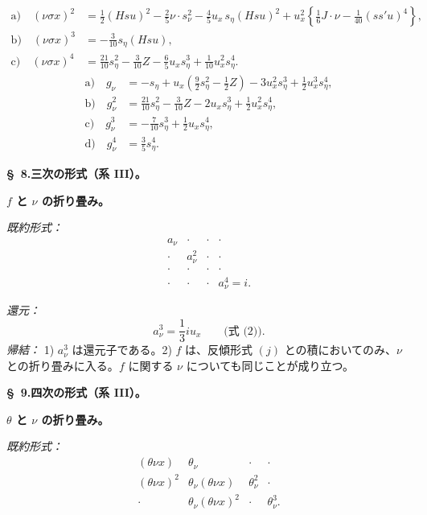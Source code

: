 \documentclass[11pt]{jlreq}
\begin{document}
\[
\tag{7}
\begin{aligned}
\text{a)}\quad (\nu\sigma x)^2
&=\frac12(Hsu)^2-\frac25\nu\cdot s_\nu^2-
\frac45u_x\,s_\eta(Hsu)^2
+u_x^2\left\{\frac16J\cdot\nu-\frac1{40}(ss'u)^4\right\},\\
\text{b)}\quad (\nu\sigma x)^3&=-\frac3{10}s_\eta(Hsu),\\
\text{c)}\quad (\nu\sigma x)^4&=\frac{21}{10}s_\eta^2-\frac3{10}Z-
\frac65u_xs_\eta^3+\frac1{10}u_x^2s_\eta^4.
\end{aligned}
\]
\[
\tag{8}
\begin{aligned}
\text{a)}\quad g_\nu&=-s_\eta+u_x\left(\frac92s_\eta^2-\frac12Z\right)-3u_x^2s_\eta^3+\frac12u_x^3s_\eta^4,\\
\text{b)}\quad g_\nu^2&=\frac{21}{10}s_\eta^2-\frac3{10}Z-2u_xs_\eta^3+\frac12u_x^2s_\eta^4,\\
\text{c)}\quad g_\nu^3&=-\frac7{10}s_\eta^3+\frac12u_xs_\eta^4,\\
\text{d)}\quad g_\nu^4&=\frac35s_\eta^4.
\end{aligned}
\]

\begin{center}
\textbf{\S\ 8.\quad 三次の形式（系 III）。}
\end{center}

\noindent\textbf{$f$ と $\nu$ の折り畳み。}

\noindent\emph{既約形式：}
\[
\begin{array}{cccc}
a_\nu&\cdot&\cdot&\cdot\\
\cdot&a_\nu^2&\cdot&\cdot\\
\cdot&\cdot&\cdot&\cdot\\
\cdot&\cdot&\cdot&a_\nu^4=i.
\end{array}
\]

\noindent\emph{還元：}
\[
a_\nu^3=\frac13 i u_x\qquad\text{(式 (2)).}
\]
\noindent\emph{帰結：} 1) $a_\nu^3$ は還元子である。2) $f$ は、反傾形式 $(j)$ との積においてのみ、$\nu$ との折り畳みに入る。$f$ に関する $\nu$ についても同じことが成り立つ。

\begin{center}
\textbf{\S\ 9.\quad 四次の形式（系 III）。}
\end{center}

\noindent\textbf{$\theta$ と $\nu$ の折り畳み。}

\noindent\emph{既約形式：}
\[
\begin{array}{cccc}
(\theta\nu x)&\theta_\nu&\cdot&\cdot\\
(\theta\nu x)^2&\theta_\nu(\theta\nu x)&\theta_\nu^2&\cdot\\
\cdot&\theta_\nu(\theta\nu x)^2&\cdot&\theta_\nu^3.
\end{array}
\]
\end{document}
